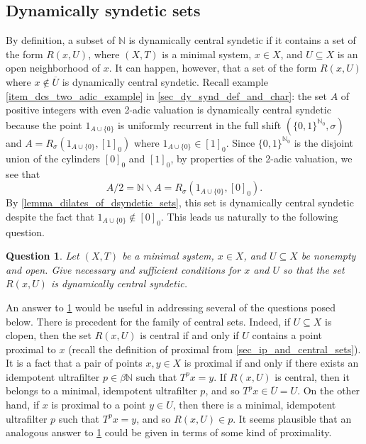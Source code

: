 \documentclass[letter,11pt]{article}
\theoremstyle{plain}
\newtheorem{question}[theorem]{Question}
\theoremstyle{definition}
\theoremstyle{plain}
\theoremstyle{plain}
\numberwithin{equation}{section}
\newcommand{\N}{\mathbb{N}}
\renewcommand{\setminus}{\backslash}
\begin{document}
\subsection{Dynamically syndetic sets}

By definition, a subset of $\N$ is dynamically central syndetic if it contains a set of the form $R(x,U)$, where $(X,T)$ is a minimal system, $x \in X$, and $U \subseteq X$ is an open neighborhood of $x$.  It can happen, however, that a set of the form $R(x,U)$ where $x \not \in \overline{U}$ is dynamically central syndetic.  Recall example \eqref{item_dcs_two_adic_example} in \cref{sec_dy_synd_def_and_char}: the set $A$ of positive integers with even 2-adic valuation is dynamically central syndetic because the point $1_{A \cup \{0\}}$ is uniformly recurrent in the full shift $(\{0,1\}^{\N_0},\sigma)$ and $A = R_\sigma(1_{A \cup \{0\}}, [1]_0)$ where $1_{A \cup \{0\}} \in [1]_0$. Since $\{0,1\}^{\N_0}$ is the disjoint union of the cylinders $[0]_0$ and $[1]_0$, by properties of the 2-adic valuation, we see that
\[A / 2 = \N \setminus A = R_\sigma(1_{A \cup \{0\}}, [0]_0).\]
By \cref{lemma_dilates_of_dsyndetic_sets}, this set is dynamically central syndetic despite the fact that $1_{A \cup \{0\}} \not\in [0]_0$.  This leads us naturally to the following question.


\begin{question}
    \label{quest_nec_and_suff_for_rxu_dcs}
    Let $(X,T)$ be a minimal system, $x \in X$, and $U \subseteq X$ be nonempty and open.  Give necessary and sufficient conditions for $x$ and $U$ so that the set $R(x,U)$ is dynamically central syndetic.
\end{question}

An answer to \cref{quest_nec_and_suff_for_rxu_dcs} would be useful in addressing several of the questions posed below. There is precedent for the family of central sets.  Indeed, if $U \subseteq X$ is clopen, then the set $R(x,U)$ is central if and only if $U$ contains a point proximal to $x$ (recall the definition of proximal from \cref{sec_ip_and_central_sets}).  It is a fact \cite[Lem. 19.22, Thms. 19.23, 19.25]{hindman_strauss_book_2012} that a pair of points $x, y \in X$ is proximal if and only if there exists an idempotent ultrafilter $p \in \beta \N$ such that $T^p x = y$.  If $R(x,U)$ is central, then it belongs to a minimal, idempotent ultrafilter $p$, and so $T^p x \in \overline{U} = U$.  On the other hand, if $x$ is proximal to a point $y \in U$, then there is a minimal, idempotent ultrafilter $p$ such that $T^p x = y$, and so $R(x,U) \in p$.  It seems plausible that an analogous answer to \cref{quest_nec_and_suff_for_rxu_dcs} could be given in terms of some kind of proximality.\\
  
\end{document}
